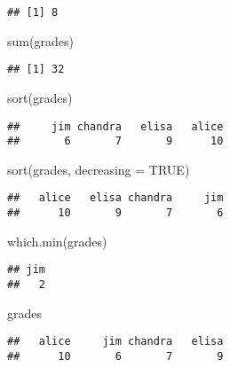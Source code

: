 \documentclass[
]{article}
\newenvironment{Shaded}{\begin{snugshade}}{\end{snugshade}}
\newcommand{\AttributeTok}[1]{\textcolor[rgb]{0.77,0.63,0.00}{#1}}
\newcommand{\ConstantTok}[1]{\textcolor[rgb]{0.00,0.00,0.00}{#1}}
\newcommand{\FunctionTok}[1]{\textcolor[rgb]{0.00,0.00,0.00}{#1}}
\newcommand{\NormalTok}[1]{#1}
\begin{document}
\begin{verbatim}
## [1] 8
\end{verbatim}

\begin{Shaded}
\begin{Highlighting}[]
\FunctionTok{sum}\NormalTok{(grades)}
\end{Highlighting}
\end{Shaded}

\begin{verbatim}
## [1] 32
\end{verbatim}

\begin{Shaded}
\begin{Highlighting}[]
\FunctionTok{sort}\NormalTok{(grades)}
\end{Highlighting}
\end{Shaded}

\begin{verbatim}
##     jim chandra   elisa   alice 
##       6       7       9      10
\end{verbatim}

\begin{Shaded}
\begin{Highlighting}[]
\FunctionTok{sort}\NormalTok{(grades, }\AttributeTok{decreasing =} \ConstantTok{TRUE}\NormalTok{)}
\end{Highlighting}
\end{Shaded}

\begin{verbatim}
##   alice   elisa chandra     jim 
##      10       9       7       6
\end{verbatim}

\begin{Shaded}
\begin{Highlighting}[]
\FunctionTok{which.min}\NormalTok{(grades)}
\end{Highlighting}
\end{Shaded}

\begin{verbatim}
## jim 
##   2
\end{verbatim}

\begin{Shaded}
\begin{Highlighting}[]
\NormalTok{grades}
\end{Highlighting}
\end{Shaded}

\begin{verbatim}
##   alice     jim chandra   elisa 
##      10       6       7       9
\end{verbatim}
\end{document}
